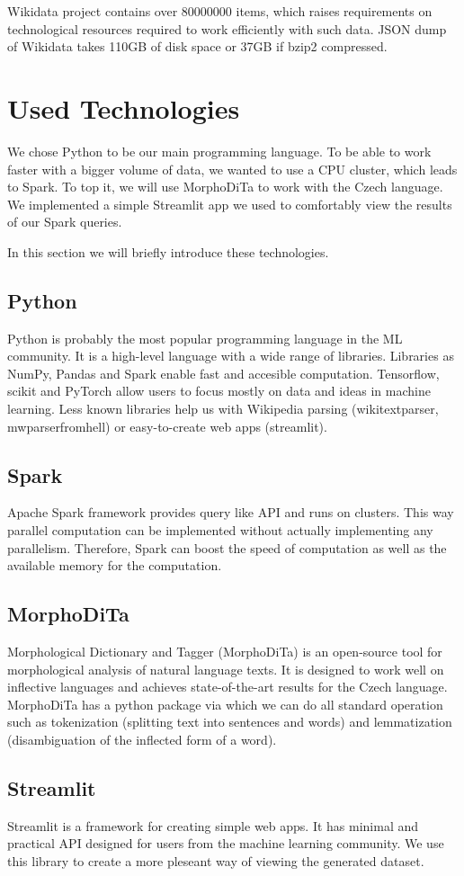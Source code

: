 Wikidata project contains over \num{80000000} items, which raises requirements on technological resources required to work efficiently with such data. JSON dump of Wikidata takes 110GB of disk space or 37GB if bzip2 compressed.



\section{Used Technologies}
We chose Python to be our main programming language. To be able to work faster with a bigger volume of data, we wanted to use a CPU cluster, which leads to Spark. To top it, we will use MorphoDiTa to work with the Czech language. We implemented a simple Streamlit app we used to comfortably view the results of our Spark queries.

In this section we will briefly introduce these technologies.

\subsection{Python}
Python is probably the most popular programming language in the ML community. It is a high-level language with a wide range of libraries. Libraries as NumPy, Pandas and Spark enable fast and accesible computation. Tensorflow, scikit and PyTorch allow users to focus mostly on data and ideas in machine learning. Less known libraries help us with Wikipedia parsing (wikitextparser, mwparserfromhell) or easy-to-create web apps (streamlit).

\subsection{Spark}
Apache Spark framework provides query like API and runs on clusters. This way parallel computation can be implemented without actually implementing any parallelism. Therefore, Spark can boost the speed of computation as well as the available memory for the computation.


\subsection{MorphoDiTa}

Morphological Dictionary and Tagger (MorphoDiTa) \citep{Morphodita} is an open-source tool for morphological analysis of natural language texts. It is designed to work well on inflective languages and achieves state-of-the-art results for the Czech language. MorphoDiTa has a python package via which we can do all standard operation such as tokenization (splitting text into sentences and words) and lemmatization (disambiguation of the inflected form of a word).

\subsection{Streamlit}
Streamlit is a framework for creating simple web apps. It has minimal and practical API designed for users from the machine learning community. We use this library to create a more pleseant way of viewing the generated dataset.





